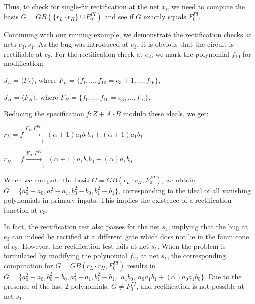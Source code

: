 Thus, to check for single-fix rectification at the net $x_i$, we need
to compute the \Grobner basis $G = GB(\{r_L\cdot r_H\}\cup F_{0}^{PI})$
and see if $G$ exactly equals $F_{0}^{PI}$.  

\begin{Example}
\label{ex:3}
Continuing with our running example, we demonstrate the rectification
checks at nets $e_3, s_1$. As the bug was introduced at $e_3$, it is
obvious that the circuit is rectifiable at $e_3$. For the
rectification check at $e_3$, we mark the polynomial $f_{10}$ for
modification:

\bi
\item $J_L = \langle F_L\rangle$, where $F_L=\{f_1,\dots, f_{10}=e_3+1,\dots, f_{16}\}$,
\item $J_H = \langle F_H\rangle$, where $F_H = \{f_1,\dots, f_{10}=e_3,\dots, f_{16}\}$.
\ei

Reducing the specification $f: Z+A\cdot B$ modulo these ideals, we get:
\bi
\item $r_L = f \xrightarrow[]{F_L, F_{0}^{PI}}_+{(\alpha+1)a_1b_1b_0+(\alpha+1)a_1b_1}$
\item $r_H = f \xrightarrow[]{F_H,F_{0}^{PI}}_+{(\alpha+1)a_1b_1b_0+(\alpha)a_1b_0}$
\ei
  
When we compute the \Grobner basis $G = GB(r_L\cdot r_H, F_{0}^{PI})$,
we obtain $G = \{a_0^2-a_0, a_1^2-a_1,b_0^2-b_0,b_1^2-b_1\}$,
corresponding to the ideal of all vanishing polynomials in primary
inputs. This implies the existence of a rectification function at
$e_3$. 

In fact, the rectification test also passes for the net $s_4$;
implying that the bug at $e_3$ can indeed be rectified at a different
gate which does not lie in the fanin cone of $e_3$. However, the
rectification test  fails at net $s_1$. When the problem is formulated by 
modifying the polynomial $f_{12}$ at net $s_1$, the corresponding
computation for $G = GB(r_L\cdot r_H, F_{0}^{PI})$ results in
$G=\{a_0^2-a_0,b_0^2-b_0,a_1^2-a_1,b_1^2-b_1, ~~a_1b_0, ~a_0a_1b_1 +
(\alpha)a_0a_1b_0\}$. Due to the presence of the last 2 polynomials, 
$G \neq F_0^{PI}$, and rectification is not possible at net $s_1$. 
\end{Example}
